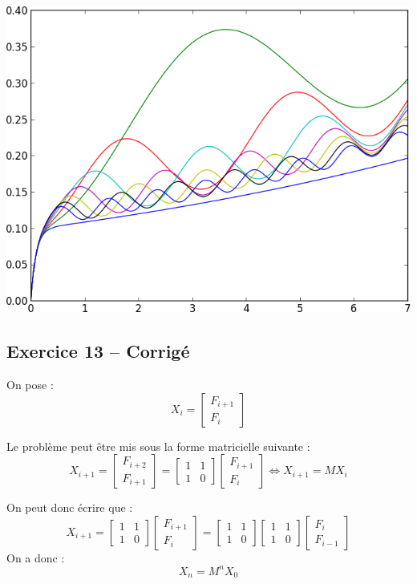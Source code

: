 \documentclass[10pt,fleqn]{article} %
\begin{document}
\begin{center}
\includegraphics[width=.4\linewidth]{images/exo_FB_12}
\end{center}


\subsection*{Exercice 13 -- Corrigé}

\begin{corrige}
On pose : 
$$
X_i =\begin{bmatrix}
F_{i+1} \\
F_{i}
\end{bmatrix} 
$$

Le problème peut être mis sous la forme matricielle suivante : 
$$
X_{i+1} =
\begin{bmatrix}
F_{i+2} \\
F_{i+1}
\end{bmatrix} 
=
\begin{bmatrix}
1 & 1  \\
1 & 0 
\end{bmatrix} 
\begin{bmatrix}
F_{i+1} \\
F_{i}
\end{bmatrix} 
\Leftrightarrow X_{i+1} = M X_{i}
$$

On  peut donc écrire que  :
$$
X_{i+1} =
\begin{bmatrix}
1 & 1  \\
1 & 0 
\end{bmatrix} 
\begin{bmatrix}
F_{i+1} \\
F_{i}
\end{bmatrix} 
=
\begin{bmatrix}
1 & 1  \\
1 & 0 
\end{bmatrix} 
\begin{bmatrix}
1 & 1  \\
1 & 0 
\end{bmatrix} 
\begin{bmatrix}
F_{i} \\
F_{i-1}
\end{bmatrix} 
$$
 On a donc :
 $$
X_{n} = M^n X_{0}
$$

\end{corrige}
\end{document}
